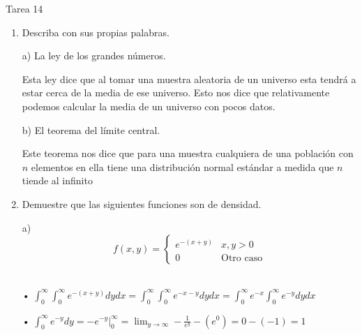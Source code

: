 \documentclass[a4paper, 12pt]{article}
\newcommand{\Aspace}{0.2cm}
\begin{document}
    \newpage
    \vspace{0.3cm}

    \begin{center}
        { \LARGE Tarea 14}
    \end{center}

    \begin{enumerate}
        \item Describa con sus propias palabras. \par          
            \vspace{\Aspace} \par
            a) La ley de los grandes números. 
            \par { \color{azul} Esta ley dice que al tomar una muestra aleatoria de un universo esta tendrá a estar cerca de la media de ese universo. Esto nos dice que relativamente podemos calcular la media de un universo con pocos datos. }

            \vspace{\Aspace} \par
            b) El teorema del límite central.
            \par { \color{azul} Este teorema nos dice que para una muestra cualquiera de una población con $n$ elementos en ella tiene una distribución normal estándar a medida que $n$ tiende al infinito }
        

        \item Demuestre que las siguientes funciones son de densidad.
            \par a)
            \[
                f(x, y) =
                \begin{cases}
                    e^{-(x + y)}    &   x , y > 0           \\
                    0               &   \text{Otro caso}
                \end{cases}
            \]
            \vspace{\Aspace}
            { \color{azul} 
                \\ • \( 
                    \int_{0}^{\infty} \int_{0}^{\infty} e^{-(x + y)}dydx
                    = \int_{0}^{\infty} \int_{0}^{\infty} e^{-x-y}dydx
                    = \int_{0}^{\infty} e^{-x} \int_{0}^{\infty} e^{-y}dydx
                \)

                • \(
                    \int_{0}^{\infty} e^{-y}dy
                    = -e^{-y} \Big|_{0}^{\infty}
                    = \lim_{y \rightarrow \infty} -\frac{1}{e^{y}} - (e^{0})
                    = 0 - (-1)
                    = 1
                \)

}
\end{enumerate}
\end{document}
